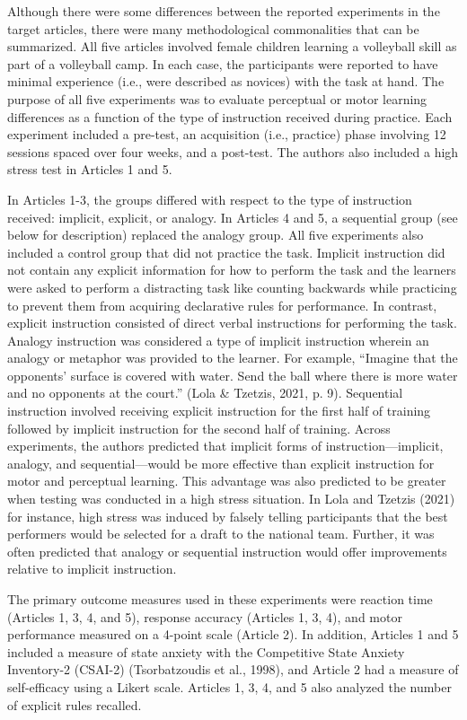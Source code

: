 \documentclass[
  english,
  man,floatsintext]{apa7}
\begin{document}
Although there were some differences between the reported experiments in the target articles, there were many methodological commonalities that can be summarized. All five articles involved female children learning a volleyball skill as part of a volleyball camp. In each case, the participants were reported to have minimal experience (i.e., were described as novices) with the task at hand. The purpose of all five experiments was to evaluate perceptual or motor learning differences as a function of the type of instruction received during practice. Each experiment included a pre-test, an acquisition (i.e., practice) phase involving 12 sessions spaced over four weeks, and a post-test. The authors also included a high stress test in Articles 1 and 5.

In Articles 1-3, the groups differed with respect to the type of instruction received: implicit, explicit, or analogy. In Articles 4 and 5, a sequential group (see below for description) replaced the analogy group. All five experiments also included a control group that did not practice the task. Implicit instruction did not contain any explicit information for how to perform the task and the learners were asked to perform a distracting task like counting backwards while practicing to prevent them from acquiring declarative rules for performance. In contrast, explicit instruction consisted of direct verbal instructions for performing the task. Analogy instruction was considered a type of implicit instruction wherein an analogy or metaphor was provided to the learner. For example, ``Imagine that the opponents' surface is covered with water. Send the ball where there is more water and no opponents at the court.'' (Lola \& Tzetzis, 2021, p. 9). Sequential instruction involved receiving explicit instruction for the first half of training followed by implicit instruction for the second half of training. Across experiments, the authors predicted that implicit forms of instruction---implicit, analogy, and sequential---would be more effective than explicit instruction for motor and perceptual learning. This advantage was also predicted to be greater when testing was conducted in a high stress situation. In Lola and Tzetzis (2021) for instance, high stress was induced by falsely telling participants that the best performers would be selected for a draft to the national team. Further, it was often predicted that analogy or sequential instruction would offer improvements relative to implicit instruction.

The primary outcome measures used in these experiments were reaction time (Articles 1, 3, 4, and 5), response accuracy (Articles 1, 3, 4), and motor performance measured on a 4-point scale (Article 2). In addition, Articles 1 and 5 included a measure of state anxiety with the Competitive State Anxiety Inventory-2 (CSAI-2) (Tsorbatzoudis et al., 1998), and Article 2 had a measure of self-efficacy using a Likert scale. Articles 1, 3, 4, and 5 also analyzed the number of explicit rules recalled.
\end{document}

